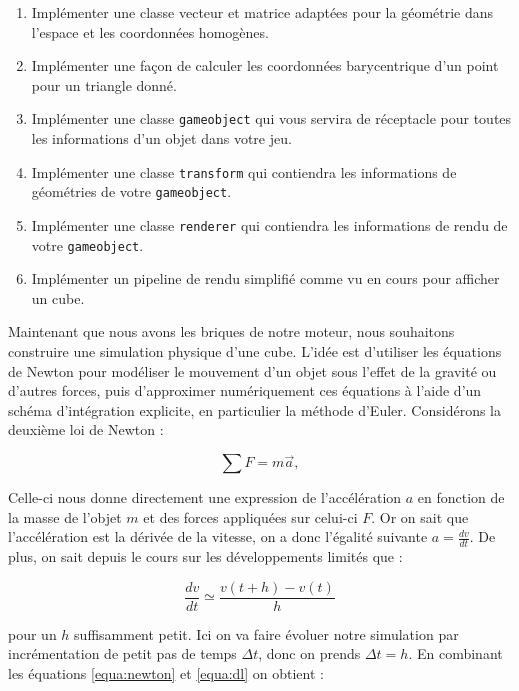 \documentclass[a4paper,12pt]{article}
\begin{document}
\begin{enumerate}
  \item Implémenter une classe vecteur et matrice adaptées pour la géométrie dans l'espace et les coordonnées homogènes.
  \item Implémenter une façon de calculer les coordonnées barycentrique d'un point pour un triangle donné. 
  \item Implémenter une classe \texttt{gameobject} qui vous servira de réceptacle pour toutes les informations d'un objet dans votre jeu.
  \item Implémenter une classe \texttt{transform} qui contiendra les informations de géométries de votre \texttt{gameobject}.
  \item Implémenter une classe \texttt{renderer} qui contiendra les informations de rendu de votre \texttt{gameobject}.
  \item Implémenter un pipeline de rendu simplifié comme vu en cours pour afficher un cube.
\end{enumerate}


Maintenant que nous avons les briques de notre moteur, nous souhaitons construire une simulation physique d'une cube. 
L'idée est d'utiliser les équations de Newton pour modéliser le mouvement d'un objet sous l'effet de la gravité ou d'autres forces, puis d'approximer numériquement ces équations à l'aide d'un schéma d'intégration explicite, en particulier la méthode d'Euler. Considérons la deuxième loi de Newton : 

\begin{equation}
    \label{equa:newton}
    \sum F = m\vec{a},
\end{equation}

Celle-ci nous donne directement une expression de l'accélération $a$ en fonction de la masse de l'objet $m$ et des forces appliquées sur celui-ci $F$. Or on sait que l'accélération est la dérivée de la vitesse, on a donc l'égalité suivante $a = \frac{dv}{dt}$. De plus, on sait depuis le cours sur les développements limités que :

\begin{equation}
    \label{equa:dl}
    \frac{dv}{dt} \simeq \frac{v(t+h)-v(t)}{h}
\end{equation}

pour un $h$ suffisamment petit. Ici on va faire évoluer notre simulation par incrémentation de petit pas de temps $\Delta t$, donc on prends $\Delta t = h$. En combinant les équations \eqref{equa:newton} et \eqref{equa:dl} on obtient :
\end{document}
